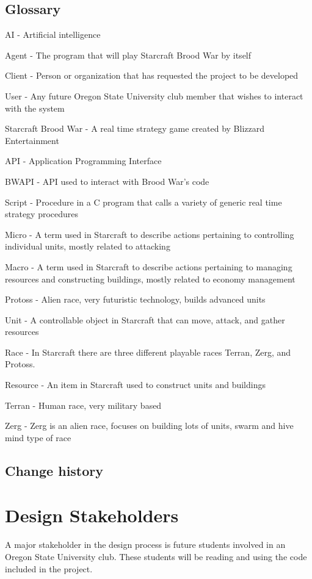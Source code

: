 \subsection{Glossary}
	AI - Artificial intelligence
	
	Agent - The program that will play Starcraft Brood War by itself
	
	Client - Person or organization that has requested the project to be developed
	
	User - Any future Oregon State University club member that wishes to interact with the system
	
	Starcraft Brood War - A real time strategy game created by Blizzard Entertainment
	
	API - Application Programming Interface
	
	BWAPI - API used to interact with Brood War's code
	
	Script - Procedure in a C program that calls a variety of generic real time strategy procedures
	
	Micro - A term used in Starcraft to describe actions pertaining to controlling individual units, mostly related to attacking
	
	Macro - A term used in Starcraft to describe actions pertaining to managing resources and constructing buildings, mostly related to economy management
	
	Protoss - Alien race, very futuristic technology, builds advanced units
	
	Unit - A controllable object in Starcraft that can move, attack, and gather resources
	
	Race - In Starcraft there are three different playable races Terran, Zerg, and Protoss.
	
	Resource - An item in Starcraft used to construct units and buildings
	
	Terran - Human race, very military based
	
	Zerg - Zerg is an alien race, focuses on building lots of units, swarm and hive mind type of race
\subsection{Change history}


\section{Design Stakeholders}
	A major stakeholder in the design process is future students involved in an Oregon State University club. These students will be reading and using the code included in the project.
	
